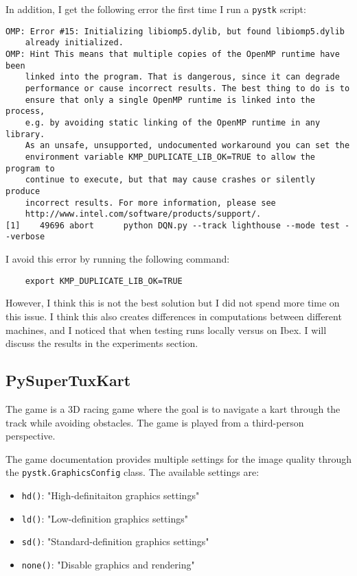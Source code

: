 \documentclass{article}
\begin{document}
In addition, I get the following error the first time I run a \texttt{pystk} script:

\begin{verbatim}
OMP: Error #15: Initializing libiomp5.dylib, but found libiomp5.dylib 
    already initialized.
OMP: Hint This means that multiple copies of the OpenMP runtime have been 
    linked into the program. That is dangerous, since it can degrade 
    performance or cause incorrect results. The best thing to do is to 
    ensure that only a single OpenMP runtime is linked into the process, 
    e.g. by avoiding static linking of the OpenMP runtime in any library. 
    As an unsafe, unsupported, undocumented workaround you can set the 
    environment variable KMP_DUPLICATE_LIB_OK=TRUE to allow the program to 
    continue to execute, but that may cause crashes or silently produce 
    incorrect results. For more information, please see 
    http://www.intel.com/software/products/support/.
[1]    49696 abort      python DQN.py --track lighthouse --mode test --verbose
\end{verbatim}

I avoid this error by running the following command:

\begin{verbatim}
    export KMP_DUPLICATE_LIB_OK=TRUE
\end{verbatim}

However, I think this is not the best solution but I did not spend more time on this issue. I think this also creates
differences in computations between different machines, and I noticed that when testing runs locally versus on Ibex. 
I will discuss the results in the experiments section.

\subsection{PySuperTuxKart}

The game is a 3D racing game where the goal is to navigate a kart through the track 
while avoiding obstacles. The game is played from a third-person perspective.

The game documentation \citep{pystk} provides multiple settings for the image quality through the \texttt{pystk.GraphicsConfig}
class. The available settings are:

\begin{itemize}
    \item \texttt{hd()}: "High-definitaiton graphics settings"
    \item \texttt{ld()}: "Low-definition graphics settings"
    \item \texttt{sd()}: "Standard-definition graphics settings"
    \item \texttt{none()}: "Disable graphics and rendering"
\end{itemize}
\end{document}
